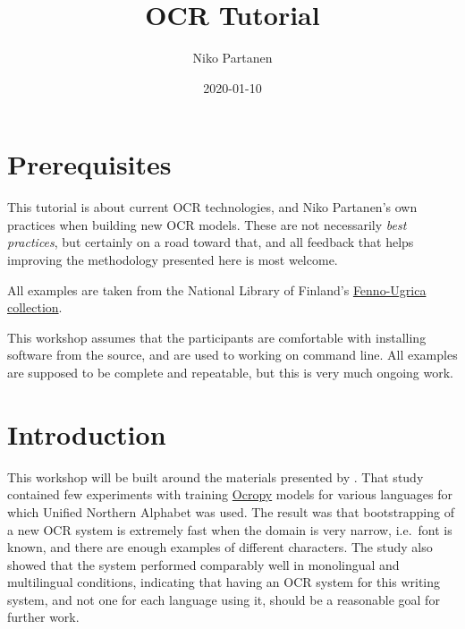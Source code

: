 \documentclass[]{book}
\title{OCR Tutorial}
\author{Niko Partanen}
\date{2020-01-10}
\begin{document}
\maketitle

{
\setcounter{tocdepth}{1}
\tableofcontents
}
\hypertarget{prerequisites}{%
\chapter{Prerequisites}\label{prerequisites}}

This tutorial is about current OCR technologies, and Niko Partanen's own practices when building new OCR models. These are not necessarily \emph{best practices}, but certainly on a road toward that, and all feedback that helps improving the methodology presented here is most welcome.

All examples are taken from the National Library of Finland's \href{https://fennougrica.kansalliskirjasto.fi/}{Fenno-Ugrica collection}.

This workshop assumes that the participants are comfortable with installing software from the source, and are used to working on command line. All examples are supposed to be complete and repeatable, but this is very much ongoing work.

\hypertarget{intro}{%
\chapter{Introduction}\label{intro}}

This workshop will be built around the materials presented by \citet{partanen2019ocr}. That study contained few experiments with training \href{https://github.com/tmbdev/ocropy}{Ocropy} models for various languages for which Unified Northern Alphabet was used. The result was that bootstrapping of a new OCR system is extremely fast when the domain is very narrow, i.e.~font is known, and there are enough examples of different characters. The study also showed that the system performed comparably well in monolingual and multilingual conditions, indicating that having an OCR system for this writing system, and not one for each language using it, should be a reasonable goal for further work.
\end{document}
